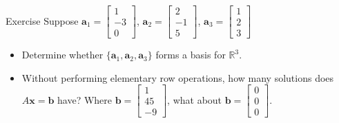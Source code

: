\documentclass{beamer}
\theoremstyle{definition}
\theoremstyle{remark}
\begin{document}
\begin{frame}[t]{Exercise}
Suppose $\mathbf a_1=\begin{bmatrix}
1\\-3\\0
\end{bmatrix}$, $\mathbf a_2=\begin{bmatrix}
2\\-1\\5
\end{bmatrix}$, $\mathbf a_3=\begin{bmatrix}
1\\2\\3
\end{bmatrix}$
\begin{itemize}
\item Determine whether $\{\mathbf a_1, \mathbf a_2, \mathbf a_3\}$ forms a basis for $\mathbb R^3$.\pause
\item Without performing elementary row operations, how many solutions does $A\mathbf x=\mathbf b$ have? Where $\mathbf b=\begin{bmatrix}
1\\45\\-9
\end{bmatrix}$, what about $\mathbf b=\begin{bmatrix}
0\\0\\0
\end{bmatrix}$.
\end{itemize}
\end{frame}
\end{document}
